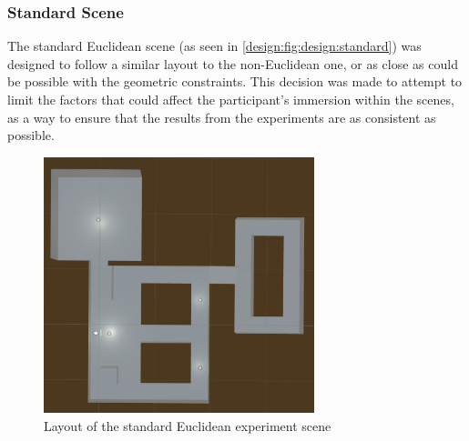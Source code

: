 		\subsubsection{Standard Scene}
			The standard Euclidean scene (as seen in \autoref{design:fig:design:standard}) was designed to follow a similar layout to the non-Euclidean one, or as close as could be possible with the geometric constraints.
			This decision was made to attempt to limit the factors that could affect the participant's immersion within the scenes, as a way to ensure that the results from the experiments are as consistent as possible.

			\begin{figure}[H]
				\includegraphics[width=0.7\textwidth]{Images/Standard_Layout}
				\centering
				\caption{Layout of the standard Euclidean experiment scene}
				\label{design:fig:design:standard}
			\end{figure}
